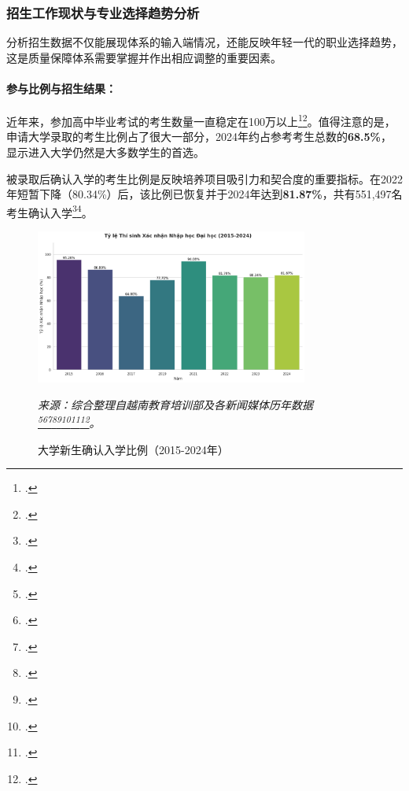 \subsubsection{招生工作现状与专业选择趋势分析}

分析招生数据不仅能展现体系的输入端情况，还能反映年轻一代的职业选择趋势，这是质量保障体系需要掌握并作出相应调整的重要因素。

\paragraph{参与比例与招生结果：}
近年来，参加高中毕业考试的考生数量一直稳定在100万以上\footcite{stat_tuyen_sinh_2024_so_lieu}\footcite{stat_thi_sinh_2024}。值得注意的是，申请大学录取的考生比例占了很大一部分，2024年约占参考考生总数的\textbf{68.5\%}，显示进入大学仍然是大多数学生的首选。

被录取后确认入学的考生比例是反映培养项目吸引力和契合度的重要指标。在2022年短暂下降（80.34\%）后，该比例已恢复并于2024年达到\textbf{81.87\%}，共有551,497名考生确认入学\footcite{stat_nhap_hoc_2024}\footcite{stat_tuyen_sinh_2024_so_lieu}。

\begin{figure}[h!]
    \centering
    \includegraphics[width=0.8\textwidth]{image/ty_le_nhap_hoc_2015-2024.png}
    
    \caption{大学新生确认入学比例（2015-2024年）}
    \label{fig:ty_le_nhap_hoc_full}
    \vspace{0.2cm}
    
    \footnotesize{\textit{来源：综合整理自越南教育培训部及各新闻媒体历年数据 
    \footcite{ref1}\footcite{ref2}\footcite{ref3}\footcite{ref5}\footcite{ref7}\footcite{ref12}\footcite{ref19}\footcite{stat_nhap_hoc_2024}。}}
\end{figure}

